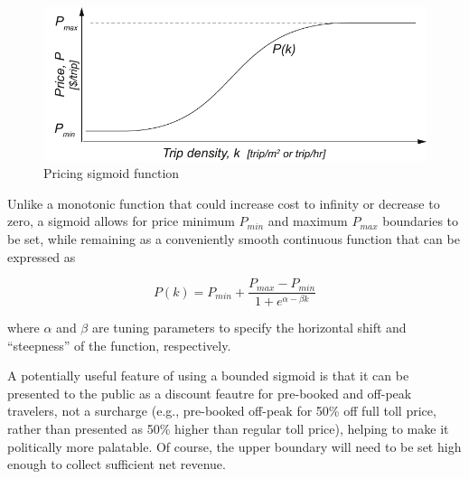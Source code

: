 \documentclass{article}
\begin{document}
\begin{figure}[h]
	\includegraphics[width=\linewidth]{figures/costdensity}
	\centering
	\caption{Pricing sigmoid function}
	\label{fig:costflow}
\end{figure}

\noindent Unlike a monotonic function that could increase cost to infinity or decrease to zero, a sigmoid allows for price minimum $P_{min}$ and maximum $P_{max}$ boundaries to be set, while remaining as a conveniently smooth continuous function that can be expressed as

\begin{equation}
P(k) = P_{min} + \frac{P_{max} - P_{min}}{1 + e^{\alpha - \beta k}}
\label{eq:price}
\end{equation}

\noindent where $\alpha$ and $\beta$ are tuning parameters to specify the horizontal shift and ``steepness'' of the function, respectively. 

A potentially useful feature of using a bounded sigmoid is that it can be presented to the public as a discount feautre for pre-booked and off-peak travelers, not a surcharge (e.g., pre-booked off-peak for 50\% off full toll price, rather than presented as 50\% higher than regular toll price), helping to make it politically more palatable. Of course, the upper boundary will need to be set high enough to collect sufficient net revenue.
\end{document}
